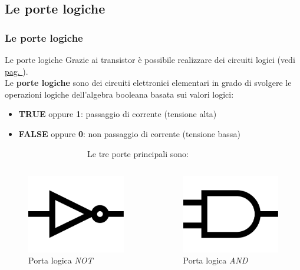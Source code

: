 \subsection[Le porte logiche]{Le porte logiche}
\begin{frame}
	\frametitle{Le porte logiche}
	
	\begin{block}{Le porte logiche}
		Grazie ai transistor è possibile realizzare dei circuiti logici (vedi \hyperlink{fig:architectures_transistors}{pag. \pageref{fig:architectures_transistors}}).\\
		Le \textbf{porte logiche} sono dei circuiti elettronici elementari in grado di svolgere le operazioni logiche dell'algebra booleana basata sui valori logici:
		\begin{itemize}
			\item \textbf{TRUE} oppure \textbf{1}: passaggio di corrente (tensione alta)
			\item \textbf{FALSE} oppure \textbf{0}: non passaggio di corrente (tensione bassa)
		\end{itemize}
	\end{block}
	$\qquad\qquad\qquad\qquad\qquad\!$Le tre porte principali sono:
	
	\begin{columns}
		\begin{figure}[!htbp]
			\centering 
			\includegraphics[width=0.5\linewidth]{images/2_le_architetture/logic_gate_not.pdf}
			\caption{Porta logica \textit{NOT}}
		\end{figure}
		
		\begin{figure}[!htbp]
			\centering 
			\includegraphics[width=0.5\linewidth]{images/2_le_architetture/logic_gate_and.pdf}
			\caption{Porta logica \textit{AND}}
		\end{figure} 
		

\end{columns}
\end{frame}
